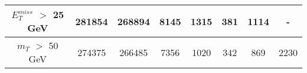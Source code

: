 \documentclass[10pt]{article}
\begin{document}
\begin{center}
\begin{table}[H]
\begin{adjustbox}{width=1\textwidth}
\begin{tabular}{cccccccc}
\multicolumn{1}{|c|}{$E_{T}^{miss}$ $>$ 25 GeV}  & \multicolumn{1}{c|}{281854} & \multicolumn{1}{c|}{268894} & \multicolumn{1}{c|}{8145} & \multicolumn{1}{c|}{1315} & \multicolumn{1}{c|}{381} & \multicolumn{1}{c|}{1114} & \multicolumn{1}{c|}{-}  \\ \hline 
\multicolumn{1}{|c|}{$m_{T}$ $>$ 50 GeV}  & \multicolumn{1}{c|}{274375} & \multicolumn{1}{c|}{266485} & \multicolumn{1}{c|}{7356} & \multicolumn{1}{c|}{1020} & \multicolumn{1}{c|}{342} & \multicolumn{1}{c|}{869} & \multicolumn{1}{c|}{2230}  \\ \hline 
\end{tabular} 										
\end{adjustbox}										
\end{table} 											
\end{center}											
\end{document}
